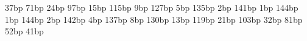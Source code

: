 37bp 71bp 
24bp 97bp 
15bp 115bp 
9bp 127bp 
5bp 135bp 
2bp 141bp 
1bp 144bp 
1bp 144bp 
2bp 142bp 
4bp 137bp 
8bp 130bp 
13bp 119bp 
21bp 103bp 
32bp 81bp 
52bp 41bp 
